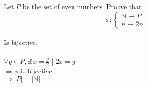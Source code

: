 \documentclass{article}
\begin{document}
\noindent Let $ P $ be the set of even numbers. Proove that\\
\[\phi: \begin{cases}
  \mathbb{N} \rightarrow P\\
  n \mapsto 2n
\end{cases}\]\\
Is bijective.\\\\
\noindent
$\forall y \in P, \exists! x = \frac{y}{2} $ | $ 2x = y $\\
$\Rightarrow \phi $ is bijective\\
$\Rightarrow |P| = |\mathbb{N}|$\\
\end{document}
